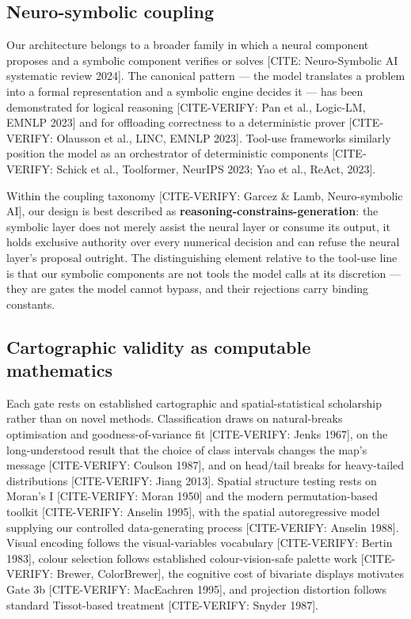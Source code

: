 \subsection{Neuro-symbolic coupling}
Our architecture belongs to a broader family in which a neural component proposes and a symbolic component verifies or solves [CITE: Neuro-Symbolic AI systematic review 2024]. The canonical pattern --- the model translates a problem into a formal representation and a symbolic engine decides it --- has been demonstrated for logical reasoning [CITE-VERIFY: Pan et al., Logic-LM, EMNLP 2023] and for offloading correctness to a deterministic prover [CITE-VERIFY: Olausson et al., LINC, EMNLP 2023]. Tool-use frameworks similarly position the model as an orchestrator of deterministic components [CITE-VERIFY: Schick et al., Toolformer, NeurIPS 2023; Yao et al., ReAct, 2023].

Within the coupling taxonomy [CITE-VERIFY: Garcez \& Lamb, Neuro-symbolic AI], our design is best described as \textbf{reasoning-constrains-generation}: the symbolic layer does not merely assist the neural layer or consume its output, it holds exclusive authority over every numerical decision and can refuse the neural layer's proposal outright. The distinguishing element relative to the tool-use line is that our symbolic components are not tools the model calls at its discretion --- they are gates the model cannot bypass, and their rejections carry binding constants.

\subsection{Cartographic validity as computable mathematics}
Each gate rests on established cartographic and spatial-statistical scholarship rather than on novel methods. Classification draws on natural-breaks optimisation and goodness-of-variance fit [CITE-VERIFY: Jenks 1967], on the long-understood result that the choice of class intervals changes the map's message [CITE-VERIFY: Coulson 1987], and on head/tail breaks for heavy-tailed distributions [CITE-VERIFY: Jiang 2013]. Spatial structure testing rests on Moran's I [CITE-VERIFY: Moran 1950] and the modern permutation-based toolkit [CITE-VERIFY: Anselin 1995], with the spatial autoregressive model supplying our controlled data-generating process [CITE-VERIFY: Anselin 1988]. Visual encoding follows the visual-variables vocabulary [CITE-VERIFY: Bertin 1983], colour selection follows established colour-vision-safe palette work [CITE-VERIFY: Brewer, ColorBrewer], the cognitive cost of bivariate displays motivates Gate 3b [CITE-VERIFY: MacEachren 1995], and projection distortion follows standard Tissot-based treatment [CITE-VERIFY: Snyder 1987].

